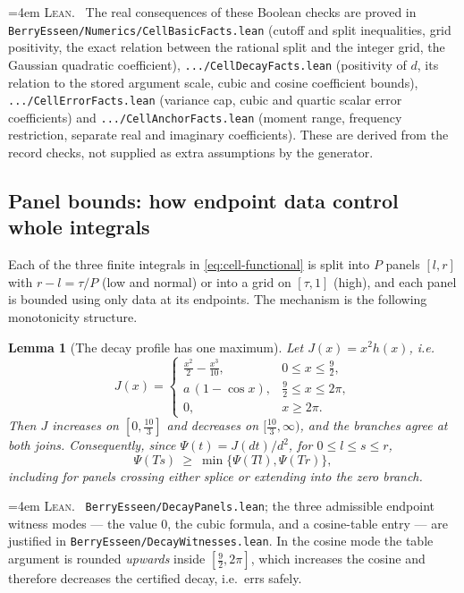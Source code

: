 \documentclass[10pt,a4paper]{article}
\theoremstyle{plain}
\newtheorem{lemma}[theorem]{Lemma}
\theoremstyle{definition}
\newcommand{\file}[1]{\texttt{#1}}
\newenvironment{leanref}%
  {\par\addvspace{3pt}\begingroup\sloppy\emergencystretch=4em
   \noindent\footnotesize\textsc{Lean.}\ \ignorespaces}%
  {\par\endgroup\addvspace{3pt}}
\begin{document}
\begin{leanref}
The real consequences of these Boolean checks are proved in
\file{BerryEsseen/Numerics/CellBasicFacts.lean} (cutoff and split
inequalities, grid positivity, the exact relation between the rational split and
the integer grid, the Gaussian quadratic coefficient),
\file{.../CellDecayFacts.lean} (positivity of $d$, its relation to the stored
argument scale, cubic and cosine coefficient bounds),
\file{.../CellErrorFacts.lean} (variance cap, cubic and quartic scalar error
coefficients) and \file{.../CellAnchorFacts.lean} (moment range, frequency
restriction, separate real and imaginary coefficients). These are derived from
the record checks, not supplied as extra assumptions by the generator.
\end{leanref}

\subsection{Panel bounds: how endpoint data control whole integrals}
\label{sec:panel-bounds}

Each of the three finite integrals in \eqref{eq:cell-functional} is split into
$P$ panels $[l,r]$ with $r-l=\tau/P$ (low and normal) or into a grid on
$[\tau,1]$ (high), and each panel is bounded using only data at its endpoints.
The mechanism is the following monotonicity structure.

\begin{lemma}[The decay profile has one maximum]\label{lem:decay-profile}
Let $J(x)=x^2h(x)$, i.e.
\[
  J(x) =
  \begin{cases}
    \tfrac{x^2}{2}-\tfrac{x^3}{10}, & 0\le x\le\tfrac92,\\
    a\,(1-\cos x), & \tfrac92\le x\le2\pi,\\
    0, & x\ge2\pi.
  \end{cases}
\]
Then $J$ increases on $[0,\tfrac{10}{3}]$ and decreases on
$[\tfrac{10}{3},\infty)$, and the branches agree at both joins. Consequently,
since $\Psi(t)=J(dt)/d^2$, for $0\le l\le s\le r$,
\[
  \Psi(Ts) \ \ge\ \min\{\Psi(Tl),\Psi(Tr)\} ,
\]
including for panels crossing either splice or extending into the zero branch.
\end{lemma}

\begin{leanref}
\file{BerryEsseen/DecayPanels.lean}; the three admissible endpoint witness
modes --- the value $0$, the cubic formula, and a cosine-table entry --- are
justified in \file{BerryEsseen/DecayWitnesses.lean}. In the cosine mode the
table argument is rounded \emph{upwards} inside $[\tfrac92,2\pi]$, which
increases the cosine and therefore decreases the certified decay, i.e.\ errs
safely.
\end{leanref}
\end{document}
